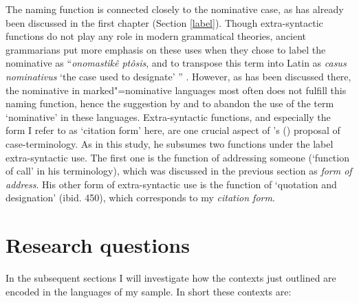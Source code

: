 The naming function is connected closely to the nominative  case, as has already been discussed in the first chapter (Section \ref{label}).
Though extra-syntactic functions do not play any role in modern grammatical theories, ancient grammarians put more emphasis on these uses when they chose to label the nominative  as ``\emph{onomastik\^e pt\^osis}, and to transpose this term into Latin as \emph{casus nominativus} `the case used to designate' '' \citep[450]{Creissels:2009}. 
However, as has been discussed there, the nominative in marked"=nominative languages most often does not fulfill this naming function, hence the suggestion by \citet{Melcuk:1997} and \citet{Creissels:2009} to abandon the use of the term `nominative' in these languages.
Extra-syntactic functions, and especially the form I refer to as `citation form' here, are one crucial aspect of \citeauthor{Creissels:2009}'s (\citeyear{Creissels:2009}) proposal of case-terminology. 
As in this study, he subsumes two functions under the label extra-syntactic use. 
The first one is the function of addressing someone (`function of call' in his terminology), which was discussed in the previous section as \textit{form of address}. 
His other form of extra-syntactic use is the function of `quotation and designation' (ibid. 450), which corresponds to my \textit{citation form}.   





\section{Research questions}\label{ExtraQuest}

In the subsequent sections I will investigate how the contexts just outlined are encoded in the languages of my sample.
In short these contexts are:

